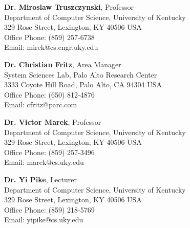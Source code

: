 {\bf Dr. Miroslaw Truszczynski}, Professor\\
Department of Computer Science,
University of Kentucky \\
329 Rose Street,
Lexington, KY 40506 USA \\
Office Phone: (859) 257-6738\\
Email: mirek@cs.engr.uky.edu
\vspace{0.2cm}

{\bf Dr. Christian Fritz}, Area Manager\\
System Sciences Lab,
Palo Alto Research Center \\
3333 Coyote Hill Road,
Palo Alto, CA 94304 USA \\
Office Phone: (650) 812-4876 \\
Email: cfritz@parc.com
\vspace{0.2cm}

{\bf Dr. Victor Marek}, Professor\\
Department of Computer Science,
University of Kentucky \\
329 Rose Street,
Lexington, KY 40506 USA \\
Office Phone: (859) 257-3496\\
Email: marek@cs.uky.edu
\vspace{0.2cm}

{\bf Dr. Yi Pike}, Lecturer\\
Department of Computer Science,
University of Kentucky \\
329 Rose Street,
Lexington, KY 40506 USA \\
Office Phone: (859) 218-5769\\
Email: yipike@cs.uky.edu
